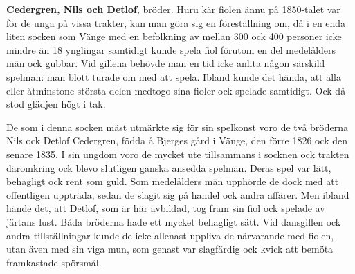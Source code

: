 \textbf{Cedergren, Nils och Detlof}, bröder. Huru kär fiolen ännu på 1850-talet var för de unga på vissa trakter, kan man göra sig en föreställning om, då i en enda liten socken som Vänge med en befolkning av mellan 300 ock 400 personer icke mindre än 18 ynglingar samtidigt kunde spela fiol förutom en del medelålders män ock gubbar. Vid gillena behövde man en tid icke anlita någon särskild spelman: man blott turade om med att spela. Ibland kunde det hända, att alla eller åtminstone största delen medtogo sina fioler ock spelade samtidigt. Ock då stod glädjen högt i tak. 

De som i denna socken mäst utmärkte sig för sin spelkonst voro de två bröderna Nils ock Detlof Cedergren, födda å Bjerges gård i Vänge, den förre 1826 ock den senare 1835. I sin ungdom voro de mycket ute tillsammans i socknen ock trakten däromkring ock blevo slutligen ganska ansedda spelmän. Deras spel var lätt, behagligt ock rent som guld. Som medelålders män upphörde de dock med att offentligen uppträda, sedan de slagit sig på handel ock andra affärer. Men ibland hände det, att Detlof, som är här avbildad, tog fram sin fiol ock spelade av järtans lust. Båda bröderna hade ett mycket behagligt sätt. Vid dansgillen ock andra tillställningar kunde de icke allenast uppliva de närvarande med fiolen, utan även med sin viga mun, som genast var slagfärdig ock kvick att bemöta framkastade spörsmål. 
